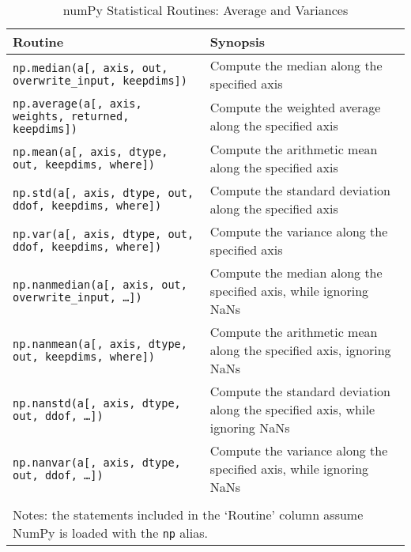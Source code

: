 \documentclass[a4paper,11pt]{book}
\numberwithin{figure}{chapter}
\numberwithin{table}{chapter}
\begin{document}
\begin{sidewaystable}[!htbp]
	\centering
	\caption{numPy Statistical Routines: Average and Variances}
	\label{tab:average_and_variances}
	\begin{tabular}{ll}
		\toprule \toprule
			Routine & Synopsis \\
			\midrule
                        \texttt{np.median(a[, axis, out, overwrite\_input, keepdims])}&
                        Compute the median along the specified axis\\
                        \texttt{np.average(a[, axis, weights, returned, keepdims])}&
                        Compute the weighted average along the specified axis\\
                        \texttt{np.mean(a[, axis, dtype, out, keepdims, where])}&
                        Compute the arithmetic mean along the specified axis\\
                        \texttt{np.std(a[, axis, dtype, out, ddof, keepdims, where])}&
                        Compute the standard deviation along the specified axis\\
                        \texttt{np.var(a[, axis, dtype, out, ddof, keepdims, where])}&
                        Compute the variance along the specified axis\\
                        \texttt{np.nanmedian(a[, axis, out, overwrite\_input, \ldots])}&
                        Compute the median along the specified axis, while ignoring NaNs\\
                        \texttt{np.nanmean(a[, axis, dtype, out, keepdims, where])}&
                        Compute the arithmetic mean along the specified axis, ignoring NaNs\\
                        \texttt{np.nanstd(a[, axis, dtype, out, ddof, \ldots])}&
                        Compute the standard deviation along the specified axis, while ignoring NaNs\\
                        \texttt{np.nanvar(a[, axis, dtype, out, ddof, \ldots])}&
                        Compute the variance along the specified axis, while ignoring NaNs\\
	     	\bottomrule \\[-1.8ex]
	        \multicolumn{2}{l}{Notes: the statements included in the `Routine' column assume NumPy is loaded with the \texttt{np} alias.} \\
	\end{tabular}
\end{sidewaystable}
\end{document}
